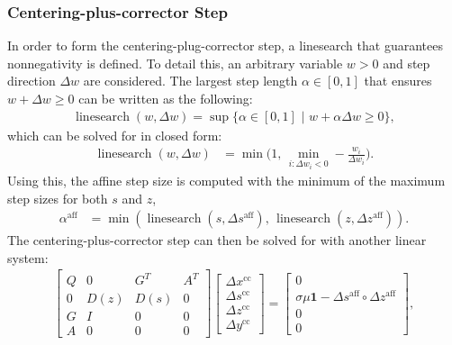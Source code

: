 \subsubsection{Centering-plus-corrector Step}
%
In order to form the centering-plug-corrector step, a linesearch that guarantees nonnegativity is defined. To detail this, an arbitrary variable $w > 0$ and step direction $\Delta w$ are considered. The largest step length $\alpha \in [0, 1]$ that ensures $w + \Delta w \geq 0$ can be written as the following:
%
\begin{align}
    \operatorname{linesearch}(w, \Delta w) = \sup\{\alpha \in [0, 1] \,\,|\,\, w + \alpha \Delta w \geq 0\},
\end{align}
%
which can be solved for in closed form:
%
\begin{align}
    \operatorname{linesearch}(w, \Delta w) &= \min \bigg( 1,\, \min_{i:\Delta w_i < 0} -\frac{w_i}{\Delta w_i} \bigg) .\label{sec:background:linesearch}
\end{align}
%
Using this, the affine step size is computed with the minimum of the maximum step sizes for both $s$ and $z$,
%
\begin{align}
    \alpha^\text{aff} &= \min( \operatorname{linesearch}(s, \Delta s^\text{aff}),\, \operatorname{linesearch}(z, \Delta z^\text{aff}) ).
\end{align}
%
The centering-plus-corrector step can then be solved for with another linear system:
%
\begin{align}
    \begin{bmatrix}
        Q & 0 & G^{T} & A^{T} \\
        0 & D(z) & D(s) & 0 \\
        G & I & 0 & 0 \\
        A & 0 & 0 & 0
    \end{bmatrix}
    \begin{bmatrix}
        \Delta x^\text{cc} \\
        \Delta s^\text{cc} \\
        \Delta z^\text{cc} \\
        \Delta y^\text{cc}
    \end{bmatrix}
    = \begin{bmatrix}
        0 \\
        \sigma \mu \mathbf{1} - \Delta s^\text{aff} \circ \Delta z^\text{aff}\\
        0\\
        0
        \end{bmatrix} \label{sec:background:ls_cc},
\end{align}
